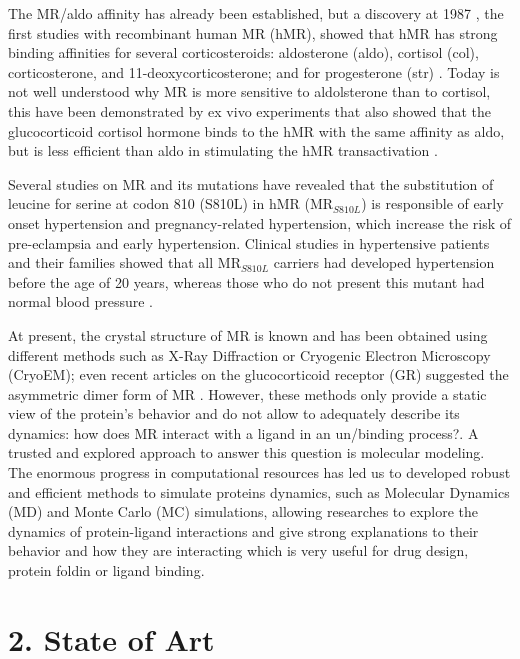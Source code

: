 \documentclass[
  journal=usp, %
  manuscript=final-report,
  year=2023,
  volume=1,
]{cup-journal}
\begin{document}
The MR/aldo affinity has already been established, but a discovery at 1987 \cite{discovery}, the first studies with recombinant human MR (hMR), showed that hMR has strong binding affinities for several corticosteroids: aldosterone (aldo), cortisol (col), corticosterone, and 11-deoxycorticosterone; and for progesterone (str) \cite{book-MR_AS4}. Today is not well understood why MR is more sensitive to aldolsterone than to cortisol, this have been demonstrated by ex vivo experiments that also showed that the glucocorticoid cortisol hormone binds to the hMR with the same affinity as aldo, but is less efficient than aldo in stimulating the hMR transactivation \cite{HELLALLEVY20001250}.

Several studies on MR and its mutations have revealed that the substitution of leucine for serine at codon 810 (S810L) in hMR (MR$_{S810L}$) is responsible of early onset hypertension and pregnancy-related hypertension, which increase the risk of pre-eclampsia and early hypertension. Clinical studies in hypertensive patients and their families showed that all MR$_{S810L}$ carriers had developed hypertension before the age of 20 years, whereas those who do not present this mutant had normal blood pressure \cite{Severe, Activating_Mineralocorticoid}.

At present, the crystal structure of MR is known and has been obtained using different methods such as X-Ray Diffraction or Cryogenic Electron Microscopy (CryoEM); even recent articles on the glucocorticoid receptor (GR) suggested the asymmetric dimer form of MR \cite{dimer}. However, these methods only provide a static view of the protein's behavior and do not allow to adequately describe its dynamics: how does MR interact with a ligand in an un/binding process?. A trusted and explored approach to answer this question is molecular modeling. The enormous progress in computational resources has led us to developed robust and efficient methods to simulate proteins dynamics, such as Molecular Dynamics (MD) and Monte Carlo (MC) simulations, allowing researches to explore the dynamics of protein-ligand interactions and give strong explanations to their behavior and how they are interacting \cite{md_evidence} which is very useful for drug design, protein foldin or ligand binding.




\section{2. State of Art}
\end{document}
